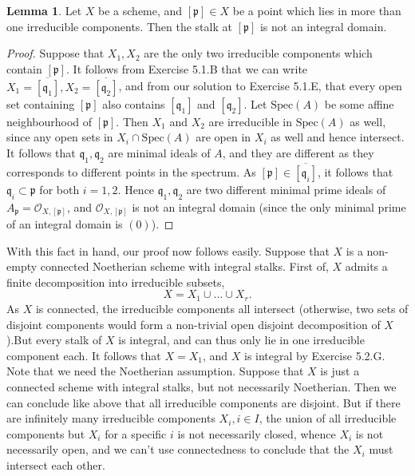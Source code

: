 \documentclass{article}
\theoremstyle{definition}
\newtheorem{lemma}[theorem]{Lemma}
\newcommand{\oo}{\mathcal{O}}
\newcommand{\Spec}{\text{Spec}}
\begin{document}
\begin{lemma}
	Let $X$ be a scheme, and $[\mathfrak{p}] \in X$ be a point which lies in
	more than one irreducible components. Then the stalk at $[\mathfrak{p}]$ is
	not an integral domain.
\end{lemma}
\begin{proof}
	Suppose that $X_1, X_2$ are the only two irreducible components which
	contain $[\mathfrak{p}]$. It follows from Exercise 5.1.B that we can write
	$X_1 = \overline{[\mathfrak{q}_1]}, X_2 = \overline{[\mathfrak{q}_2]}$, and
	from our solution to Exercise 5.1.E, that every open set containing
	$[\mathfrak{p}]$ also contains $[\mathfrak{q}_1]$ and $[\mathfrak{q}_2]$.
	Let $\Spec(A)$ be some affine neighbourhood of $[\mathfrak{p}]$. Then $X_1$
	and $X_2$ are irreducible in $\Spec(A)$ as well, since any open sets in
	$X_i \cap \Spec(A)$ are open in $X_i$ as well and hence intersect. It
	follows that $\mathfrak{q}_1, \mathfrak{q}_2$ are minimal ideals of $A$,
	and they are different as they corresponds to different points in the
	spectrum. As $[\mathfrak{p}] \in \overline{[\mathfrak{q}_i]}$, it follows
	that $\mathfrak{q}_i \subset \mathfrak{p}$ for both $i = 1,2$. Hence
	$\mathfrak{q}_1, \mathfrak{q}_2$ are two different minimal prime ideals of
	$A_{\mathfrak{p}} = \oo_{X, [\mathfrak{p}]}$, and $\oo_{X, [\mathfrak{p}]}$
	is not an integral domain (since the only minimal prime of an integral
	domain is $(0)$).
\end{proof}

With this fact in hand, our proof now follows easily. Suppose that $X$ is a
non-empty connected Noetherian scheme with integral stalks. First of, $X$
admits a finite decomposition into irreducible subsets,
\[
	X = X_1 \cup \ldots \cup X_r.
\]
As $X$ is connected, the irreducible components all intersect (otherwise, two
sets of disjoint components would form a non-trivial open disjoint
decomposition of $X$).But every stalk of $X$ is integral, and can thus only lie
in one irreducible component each. It follows that $X = X_1$, and $X$ is
integral by Exercise 5.2.G. \\

Note that we need the Noetherian assumption. Suppose that $X$ is just a
connected scheme with integral stalks, but not necessarily Noetherian. Then we
can conclude like above that all irreducible components are disjoint. But if
there are infinitely many irreducible components $X_i, i \in I$, the union of
all irreducible components but $X_i$ for a specific $i$ is not necessarily
closed, whence $X_i$ is not necessarily open, and we can't use connectedness to
conclude that the $X_i$ must intersect each other.
\end{document}
